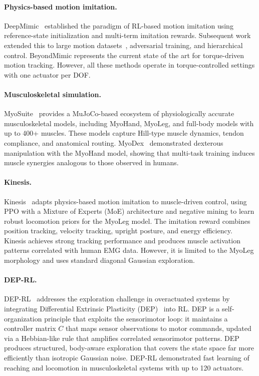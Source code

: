 \documentclass[10pt,twocolumn]{article}
\begin{document}
\paragraph{Physics-based motion imitation.}
DeepMimic~\citep{peng2018deepmimic} established the paradigm of RL-based motion imitation using reference-state initialization and multi-term imitation rewards. Subsequent work extended this to large motion datasets~\citep{peng2021amp}, adversarial training, and hierarchical control. BeyondMimic represents the current state of the art for torque-driven motion tracking. However, all these methods operate in torque-controlled settings with one actuator per DOF.

\paragraph{Musculoskeletal simulation.}
MyoSuite~\citep{myosuite} provides a MuJoCo-based ecosystem of physiologically accurate musculoskeletal models, including MyoHand, MyoLeg, and full-body models with up to 400+ muscles. These models capture Hill-type muscle dynamics, tendon compliance, and anatomical routing. MyoDex~\citep{myodex} demonstrated dexterous manipulation with the MyoHand model, showing that multi-task training induces muscle synergies analogous to those observed in humans.

\paragraph{Kinesis.}
Kinesis~\citep{kinesis2024} adapts physics-based motion imitation to muscle-driven control, using PPO with a Mixture of Experts (MoE) architecture and negative mining to learn robust locomotion priors for the MyoLeg model. The imitation reward combines position tracking, velocity tracking, upright posture, and energy efficiency. Kinesis achieves strong tracking performance and produces muscle activation patterns correlated with human EMG data. However, it is limited to the MyoLeg morphology and uses standard diagonal Gaussian exploration.

\paragraph{DEP-RL.}
DEP-RL~\citep{deprl2023} addresses the exploration challenge in overactuated systems by integrating Differential Extrinsic Plasticity (DEP)~\citep{der2015novel} into RL. DEP is a self-organization principle that exploits the sensorimotor loop: it maintains a controller matrix $C$ that maps sensor observations to motor commands, updated via a Hebbian-like rule that amplifies correlated sensorimotor patterns. DEP produces structured, body-aware exploration that covers the state space far more efficiently than isotropic Gaussian noise. DEP-RL demonstrated fast learning of reaching and locomotion in musculoskeletal systems with up to 120 actuators.
\end{document}
